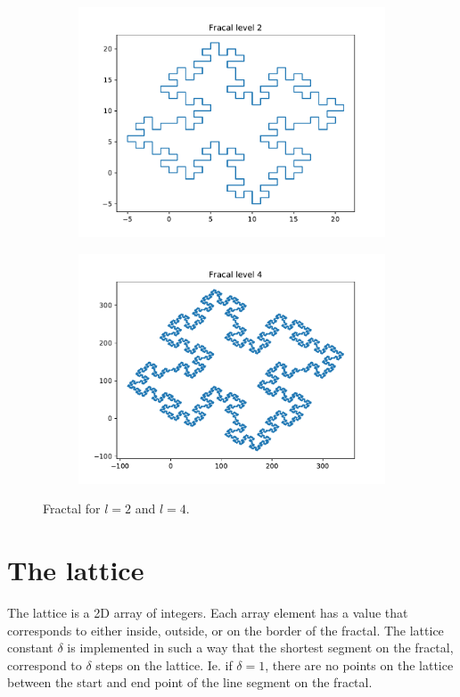 \documentclass[a4paper, 12pt]{article}
\begin{document}
\begin{figure}[h]
  \centering
  \begin{subfigure}[b]{.49\textwidth}
      \includegraphics[width=\textwidth]{media/fractal_l2}
  \end{subfigure}
  \begin{subfigure}[b]{.49\textwidth}
      \includegraphics[width=\textwidth]{media/fractal_l4}
  \end{subfigure}
  \caption{Fractal for $l=2$ and $l=4$.}
\end{figure}

\section{The lattice\label{sec:lattice}}
The lattice is a 2D array of integers.
Each array element has a value that corresponds to either inside, outside, or on the border of the fractal.
The lattice constant $\delta$ is implemented in such a way that the shortest segment on the fractal, correspond to $\delta$ steps on the lattice.
Ie. if $\delta=1$, there are no points on the lattice between the start and end point of the line segment on the fractal.
\end{document}
